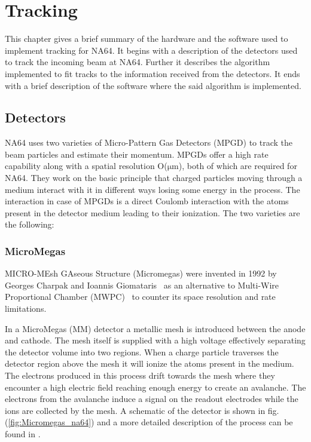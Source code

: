 
\chapter{Tracking}
\label{sec:tracking}
This chapter gives a brief summary of the hardware and the software used to implement tracking for NA64. It begins with a description of the detectors used to track the incoming beam at NA64. Further it describes the algorithm implemented to fit tracks to the information received from the detectors. It ends with a brief description of the software where the said algorithm is implemented.

\section{Detectors}
NA64 uses two varieties of Micro-Pattern Gas Detectors (MPGD) to track the beam particles and estimate their momentum. MPGDs offer a high rate capability along with a spatial resolution O($\mathrm{\mu m}$), both of which are required for NA64. They work on the basic principle that charged particles moving through a medium interact with it in different ways losing some energy in the process. The interaction in case of MPGDs is a direct Coulomb interaction with the atoms present in the detector medium leading to their ionization. The two varieties are the following:
\subsection{MicroMegas}
\label{sec:MM}
MICRO-MEsh GAseous Structure (Micromegas) were invented in 1992 by Georges Charpak and Ioannis Giomataris~\cite{CHARPAK200226} as an alternative to Multi-Wire Proportional Chamber (MWPC)~\cite{Sauli:1977mt} to counter its space resolution and rate limitations.

In a MicroMegas (MM) detector a metallic mesh is introduced between the anode and cathode. The mesh itself is supplied with a high voltage effectively separating the detector volume into two regions. When a charge particle traverses the detector region above the mesh it will ionize the atoms present in the medium. The electrons produced in this process drift towards the mesh where they encounter a high electric field reaching enough energy to create an avalanche. The electrons from the avalanche induce a signal on the readout electrodes while the ions are collected by the mesh. A schematic of the detector is shown in fig.(\ref{fig:Micromegas_na64}) and a more detailed description of the process can be found in \cite{CHARPAK200226}.

